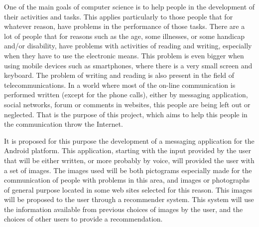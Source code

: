One of the main goals of computer science is to help people in the development of their activities and tasks. This applies particularly to those people that for whatever reason, have problems in the performance of those tasks. There are a lot of people that for reasons such as the age, some illnesses, or some handicap and/or disability, have problems with activities of reading and writing, especially when they have to use the electronic means. This problem is even bigger when using mobile devices such as smartphones, where there is a very small screen and keyboard. The problem of writing and reading is also present in the field of telecommunications. In a world where most of the on-line communication is performed written (except for the phone calls),  either by messaging application, social networks, forum or comments in websites, this people are being left out or neglected. That is the purpose of this project,  which aims to help this people in the communication throw the Internet.

It is proposed for this purpose the development of a messaging application for the Android platform. This application, starting with the input provided by the user that will be either written, or more probably by voice, will provided the user with a set of images. The images used will be both pictograms especially made for the communication of people with problems in this area, and images or photographs of general purpose located in some web sites selected for this reason. This images will be proposed  to the user through a recommender system. This system will use the information available from previous choices of images by the user, and the choices of other users to provide a recommendation.